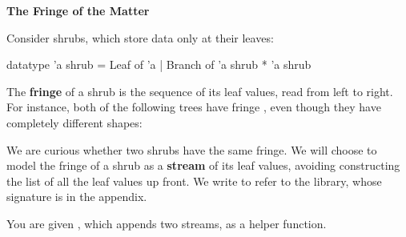 \newpage
{}

\textbf{The Fringe of the Matter}

Consider shrubs, which store data only at their leaves:
\begin{codeblock}
  datatype 'a shrub = Leaf of 'a | Branch of 'a shrub * 'a shrub
\end{codeblock}

The \textbf{fringe} of a shrub is the sequence of its leaf values, read from left
to right. For instance, both of the following trees have fringe
, even though they have completely different shapes:

\begin{center}
  \hspace{2cm}
\end{center}

We are curious whether two shrubs have the same fringe. We will choose to
model the fringe of a shrub as a \textbf{stream} of its leaf values, avoiding
constructing the list of all the leaf values up front. We write
 to refer to the  library, whose signature is in the appendix.

You are given , which appends two streams,
as a helper function.


